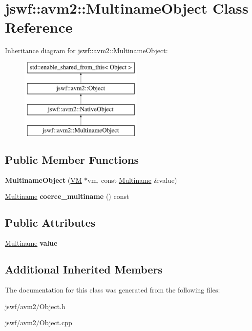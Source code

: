 \hypertarget{classjswf_1_1avm2_1_1_multiname_object}{\section{jswf\+:\+:avm2\+:\+:Multiname\+Object Class Reference}
\label{classjswf_1_1avm2_1_1_multiname_object}
}
Inheritance diagram for jswf\+:\+:avm2\+:\+:Multiname\+Object\+:\begin{figure}[H]
\begin{center}
\leavevmode
\includegraphics[height=4.000000cm]{classjswf_1_1avm2_1_1_multiname_object}
\end{center}
\end{figure}
\subsection*{Public Member Functions}
\begin{DoxyCompactItemize}
\item 
\hypertarget{classjswf_1_1avm2_1_1_multiname_object_adb163cbdc0e81445056fc4b311304e3e}{{\bfseries Multiname\+Object} (\hyperlink{classjswf_1_1avm2_1_1_v_m}{V\+M} $\ast$vm, const \hyperlink{structjswf_1_1avm2_1_1_multiname}{Multiname} \&value)}\label{classjswf_1_1avm2_1_1_multiname_object_adb163cbdc0e81445056fc4b311304e3e}

\item 
\hypertarget{classjswf_1_1avm2_1_1_multiname_object_ac1cd5835bb09899fca299c002505fcce}{\hyperlink{structjswf_1_1avm2_1_1_multiname}{Multiname} {\bfseries coerce\+\_\+multiname} () const }\label{classjswf_1_1avm2_1_1_multiname_object_ac1cd5835bb09899fca299c002505fcce}

\end{DoxyCompactItemize}
\subsection*{Public Attributes}
\begin{DoxyCompactItemize}
\item 
\hypertarget{classjswf_1_1avm2_1_1_multiname_object_a0e7a05691c60a91ab7024d184d53f6ff}{\hyperlink{structjswf_1_1avm2_1_1_multiname}{Multiname} {\bfseries value}}\label{classjswf_1_1avm2_1_1_multiname_object_a0e7a05691c60a91ab7024d184d53f6ff}

\end{DoxyCompactItemize}
\subsection*{Additional Inherited Members}


The documentation for this class was generated from the following files\+:\begin{DoxyCompactItemize}
\item 
jswf/avm2/Object.\+h\item 
jswf/avm2/Object.\+cpp\end{DoxyCompactItemize}
